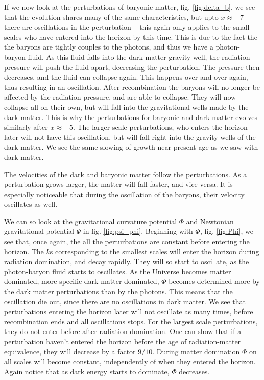 \documentclass[a4paper,norsk, 10pt]{article}
\begin{document}
If we now look at the perturbations of baryonic matter, fig. \ref{fig:delta_b}, we see that the evolution shares many of the same characteristics, but upto $x \approx -7$ there are oscillations in the perturbation -- this again only applies to the small scales who have entered into the horizon by this time. This is due to the fact the the baryons are tightly couples to the photons, and thus we have a photon-baryon fluid. As this fluid falls into the dark matter gravity well, the radiation pressure will push the fluid apart, decreasing the perturbation. The pressure then decreases, and the fluid can collapse again. This happens over and over again, thus resulting in an oscillation. After recombination the baryons will no longer be affected by the radiation pressure, and are able to collapse. They will now collapse all on their own, but will fall into the gravitational wells made by the dark matter. This is why the perturbations for baryonic and dark matter evolves similarly after $x\approx -5$. The larger scale perturbations, who enters the horizon later will not have this oscillation, but will fall right into the gravity wells of the dark matter. We see the same slowing of growth near present age as we saw with dark matter.

The velocities of the dark and baryonic matter follow the perturbations. As a perturbation grows larger, the matter will fall faster, and vice versa. It is especially noticeable that during the oscillation of the baryons, their velocity oscillates as well. 

We can so look at the gravitational curvature potential $\Phi$ and Newtonian gravitational potential $\Psi$ in fig. \ref{fig:psi_phi}. Beginning with $\Phi$, fig. \ref{fig:Phi}, we see that, once again, the all the perturbations are constant before entering the horizon. The $k$s corresponding to the smallest scales will enter the horizon during radiation domination, and decay rapidly. They will so start to oscillate, as the photon-baryon fluid starts to oscillates. As the Universe becomes matter dominated, more specific dark matter dominated, $\Phi$ becomes determined more by the dark matter perturbations than by the photons. This means that the oscillation die out, since there are no oscillations in dark matter. We see that perturbations entering the horizon later will not oscillate as many times, before recombination ends and all oscillations stops. For the largest scale perturbations, they do not enter before after radiation domination. One can show that if a perturbation haven't entered the horizon before the age of radiation-matter equivalence, they will decrease by a factor $9/10$. During matter domination $\Phi$ on all scales will become constant, independently of when they entered the horizon. Again notice that as dark energy starts to dominate, $\Phi$ decreases.
\end{document}
